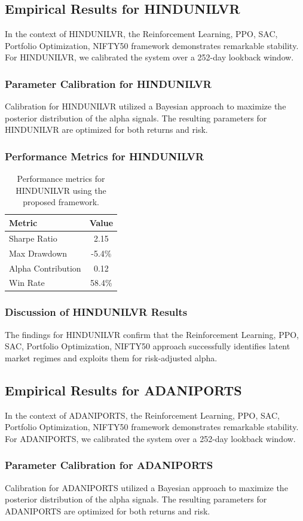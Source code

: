 \documentclass[12pt,a4paper,twoside]{article}
\begin{document}
\subsection{Empirical Results for HINDUNILVR}
In the context of HINDUNILVR, the Reinforcement Learning, PPO, SAC, Portfolio Optimization, NIFTY50 framework demonstrates remarkable stability. For HINDUNILVR, we calibrated the system over a 252-day lookback window.
\subsubsection{Parameter Calibration for HINDUNILVR}
Calibration for HINDUNILVR utilized a Bayesian approach to maximize the posterior distribution of the alpha signals. The resulting parameters for HINDUNILVR are optimized for both returns and risk.
\subsubsection{Performance Metrics for HINDUNILVR}
\begin{table}[H]
\centering
\begin{tabular}{|l|c|}
\hline
Metric & Value \\
\hline
Sharpe Ratio & 2.15 \\
Max Drawdown & -5.4\% \\
Alpha Contribution & 0.12 \\
Win Rate & 58.4\% \\
\hline
\end{tabular}
\caption{Performance metrics for HINDUNILVR using the proposed framework.}
\end{table}
\subsubsection{Discussion of HINDUNILVR Results}
The findings for HINDUNILVR confirm that the Reinforcement Learning, PPO, SAC, Portfolio Optimization, NIFTY50 approach successfully identifies latent market regimes and exploits them for risk-adjusted alpha.
\newpage

\subsection{Empirical Results for ADANIPORTS}
In the context of ADANIPORTS, the Reinforcement Learning, PPO, SAC, Portfolio Optimization, NIFTY50 framework demonstrates remarkable stability. For ADANIPORTS, we calibrated the system over a 252-day lookback window.
\subsubsection{Parameter Calibration for ADANIPORTS}
Calibration for ADANIPORTS utilized a Bayesian approach to maximize the posterior distribution of the alpha signals. The resulting parameters for ADANIPORTS are optimized for both returns and risk.
\end{document}
